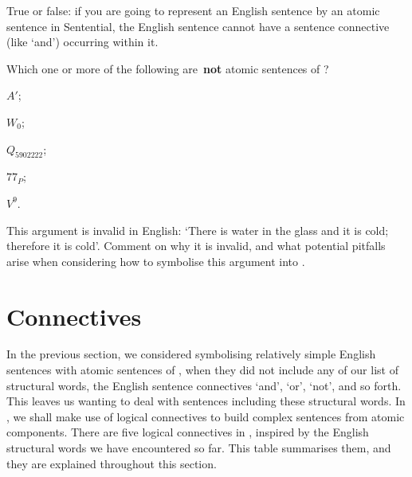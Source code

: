 
\practiceproblems

\problempart True or false: if you are going to represent an English sentence by an atomic sentence in Sentential, the English sentence cannot have a sentence connective (like ‘and’) occurring within it.

\problempart Which one or more of the following are \textbf{not} atomic sentences of \TFL? \begin{earg}
	\item $A'$;
	\item $W_{0}$;
	\item $Q_{5902222}$;
	\item $77_{P}$;
	\item $V^{9}$.
\end{earg}

\problempart This argument is invalid in English: `There is water in the glass and it is cold; therefore it is cold'. Comment on why it is invalid, and what potential pitfalls arise when considering how to symbolise this argument into \TFL. 


\chapter{Connectives}\label{s:TFLConnectives}
In the previous section, we considered symbolising relatively simple English sentences with atomic sentences of \TFL, when they did not include any of our list of structural words, the English sentence connectives `and', `or', `not', and so forth. This leaves us wanting to deal with sentences including these structural words. In \TFL, we shall make use of logical connectives to build complex sentences from atomic components. There are five logical connectives in \TFL, inspired by the English structural words we have encountered so far. This table summarises them, and they are explained throughout this section. 


